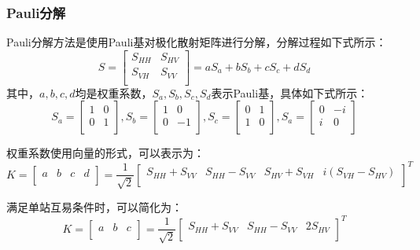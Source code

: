 \subsubsection{Pauli分解}
Pauli分解方法是使用Pauli基对极化散射矩阵进行分解，分解过程如下式所示：
\begin{equation}
  S=\left[ \begin{matrix}
      S_{HH} & S_{HV} \\
      S_{VH} & S_{VV} \\
    \end{matrix} \right] =aS_a+bS_b+cS_c+dS_d
\end{equation}
其中，$a,b,c,d$均是权重系数，$S_a,S_b,S_c,S_d$表示Pauli基，具体如下式所示：
\begin{equation}
  S_a=\left[ \begin{matrix}
      1 & 0 \\
      0 & 1 \\
    \end{matrix} \right] ,S_b=\left[ \begin{matrix}
      1 & 0  \\
      0 & -1 \\
    \end{matrix} \right] ,S_c=\left[ \begin{matrix}
      0 & 1 \\
      1 & 0 \\
    \end{matrix} \right] ,S_a=\left[ \begin{matrix}
      0 & -i \\
      i & 0  \\
    \end{matrix} \right]
\end{equation}

权重系数使用向量的形式，可以表示为：
\begin{equation}
  K=\left[ \begin{matrix}
      a & b & c & d \\
    \end{matrix} \right] =\frac{1}{\sqrt{2}}\left[ \begin{matrix}
      S_{HH}+S_{VV} & S_{HH}-S_{VV} & S_{HV}+S_{VH} & i\left( S_{VH}-S_{HV} \right) \\
    \end{matrix} \right] ^T
\end{equation}

满足单站互易条件时，可以简化为：
\begin{equation}
  K=\left[ \begin{matrix}
      a & b & c \\
    \end{matrix} \right] =\frac{1}{\sqrt{2}}\left[ \begin{matrix}
      S_{HH}+S_{VV} & S_{HH}-S_{VV} & 2S_{HV} \\
    \end{matrix} \right] ^T
\end{equation}


